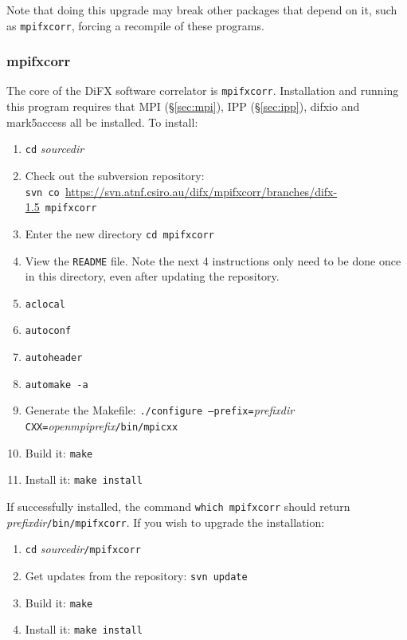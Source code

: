 Note that doing this upgrade may break other packages that depend on it, such as {\tt mpifxcorr}, forcing a recompile of these programs.










\subsubsection{mpifxcorr}

The core of the DiFX software correlator is {\tt mpifxcorr}.  
Installation and running this program requires that MPI (\S\ref{sec:mpi}), IPP (\S\ref{sec:ipp}), difxio and mark5access all be installed.
To install:
\begin{enumerate}
\item {\tt cd} {\em sourcedir}
\item Check out the subversion repository: \\
{\tt svn co }\url{https://svn.atnf.csiro.au/difx/mpifxcorr/branches/difx-1.5}{\tt\ mpifxcorr}
\item Enter the new directory {\tt cd mpifxcorr}
\item View the {\tt README} file.  
Note the next 4 instructions only need to be done once in this directory, even after updating the repository.
\item {\tt aclocal}
\item {\tt autoconf}
\item {\tt autoheader}
\item {\tt automake -a}
\item Generate the Makefile: {\tt ./configure --prefix=}{\em prefixdir} {\tt CXX=}{\em openmpiprefix}{\tt /bin/mpicxx}
\item Build it: {\tt make}
\item Install it: {\tt make install}
\end{enumerate}

If successfully installed, the command {\tt which mpifxcorr} should return {\em prefixdir}{\tt /bin/mpifxcorr}.
If you wish to upgrade the installation:
\begin{enumerate}
\item {\tt cd} {\em sourcedir}{\tt /mpifxcorr}
\item Get updates from the repository: {\tt svn update}
\item Build it: {\tt make}
\item Install it: {\tt make install}
\end{enumerate}








